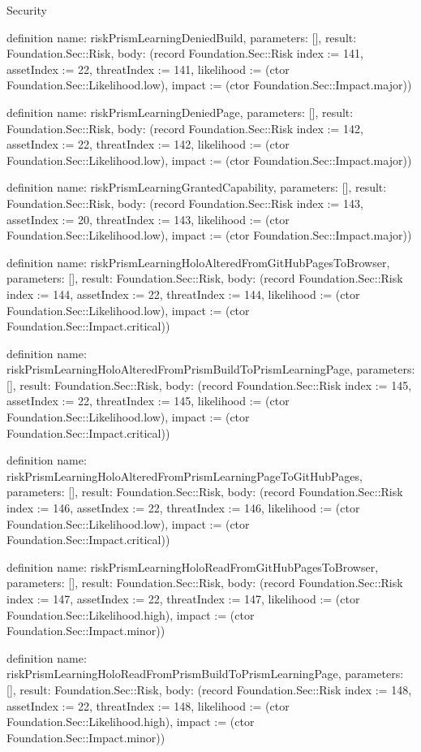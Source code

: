 \begin{lexlean}{Security}
\begin{semanticmodule}
definition{
  name: riskPrismLearningDeniedBuild,
  parameters: [],
  result: Foundation.Sec::Risk,
  body: (record Foundation.Sec::Risk {index := 141, assetIndex := 22, threatIndex := 141, likelihood := (ctor Foundation.Sec::Likelihood.low), impact := (ctor Foundation.Sec::Impact.major)})
}

definition{
  name: riskPrismLearningDeniedPage,
  parameters: [],
  result: Foundation.Sec::Risk,
  body: (record Foundation.Sec::Risk {index := 142, assetIndex := 22, threatIndex := 142, likelihood := (ctor Foundation.Sec::Likelihood.low), impact := (ctor Foundation.Sec::Impact.major)})
}

definition{
  name: riskPrismLearningGrantedCapability,
  parameters: [],
  result: Foundation.Sec::Risk,
  body: (record Foundation.Sec::Risk {index := 143, assetIndex := 20, threatIndex := 143, likelihood := (ctor Foundation.Sec::Likelihood.low), impact := (ctor Foundation.Sec::Impact.major)})
}

definition{
  name: riskPrismLearningHoloAlteredFromGitHubPagesToBrowser,
  parameters: [],
  result: Foundation.Sec::Risk,
  body: (record Foundation.Sec::Risk {index := 144, assetIndex := 22, threatIndex := 144, likelihood := (ctor Foundation.Sec::Likelihood.low), impact := (ctor Foundation.Sec::Impact.critical)})
}

definition{
  name: riskPrismLearningHoloAlteredFromPrismBuildToPrismLearningPage,
  parameters: [],
  result: Foundation.Sec::Risk,
  body: (record Foundation.Sec::Risk {index := 145, assetIndex := 22, threatIndex := 145, likelihood := (ctor Foundation.Sec::Likelihood.low), impact := (ctor Foundation.Sec::Impact.critical)})
}

definition{
  name: riskPrismLearningHoloAlteredFromPrismLearningPageToGitHubPages,
  parameters: [],
  result: Foundation.Sec::Risk,
  body: (record Foundation.Sec::Risk {index := 146, assetIndex := 22, threatIndex := 146, likelihood := (ctor Foundation.Sec::Likelihood.low), impact := (ctor Foundation.Sec::Impact.critical)})
}

definition{
  name: riskPrismLearningHoloReadFromGitHubPagesToBrowser,
  parameters: [],
  result: Foundation.Sec::Risk,
  body: (record Foundation.Sec::Risk {index := 147, assetIndex := 22, threatIndex := 147, likelihood := (ctor Foundation.Sec::Likelihood.high), impact := (ctor Foundation.Sec::Impact.minor)})
}

definition{
  name: riskPrismLearningHoloReadFromPrismBuildToPrismLearningPage,
  parameters: [],
  result: Foundation.Sec::Risk,
  body: (record Foundation.Sec::Risk {index := 148, assetIndex := 22, threatIndex := 148, likelihood := (ctor Foundation.Sec::Likelihood.high), impact := (ctor Foundation.Sec::Impact.minor)})
}


\end{semanticmodule}
\end{lexlean}
